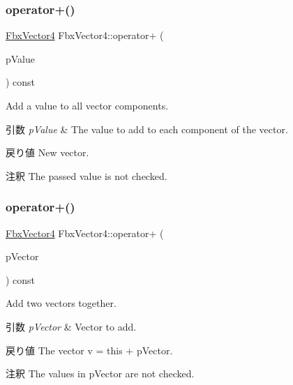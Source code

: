 \subsubsection{\texorpdfstring{operator+()}{operator+()}\hspace{0.1cm}{\footnotesize\ttfamily [1/2]}}
{\footnotesize\ttfamily \hyperlink{class_fbx_vector4}{Fbx\+Vector4} Fbx\+Vector4\+::operator+ (\begin{DoxyParamCaption}\item[{double}]{p\+Value }\end{DoxyParamCaption}) const}

Add a value to all vector components. 
\begin{DoxyParams}{引数}
{\em p\+Value} & The value to add to each component of the vector. \\
\hline
\end{DoxyParams}
\begin{DoxyReturn}{戻り値}
New vector. 
\end{DoxyReturn}
\begin{DoxyRemark}{注釈}
The passed value is not checked. 
\end{DoxyRemark}
\mbox{\label{class_fbx_vector4_aa85736514639224c7e1057facc73a040}} 
\subsubsection{\texorpdfstring{operator+()}{operator+()}\hspace{0.1cm}{\footnotesize\ttfamily [2/2]}}
{\footnotesize\ttfamily \hyperlink{class_fbx_vector4}{Fbx\+Vector4} Fbx\+Vector4\+::operator+ (\begin{DoxyParamCaption}\item[{const \hyperlink{class_fbx_vector4}{Fbx\+Vector4} \&}]{p\+Vector }\end{DoxyParamCaption}) const}

Add two vectors together. 
\begin{DoxyParams}{引数}
{\em p\+Vector} & Vector to add. \\
\hline
\end{DoxyParams}
\begin{DoxyReturn}{戻り値}
The vector v\textquotesingle{} = this + p\+Vector. 
\end{DoxyReturn}
\begin{DoxyRemark}{注釈}
The values in p\+Vector are not checked. 
\end{DoxyRemark}
\mbox{\label{class_fbx_vector4_a7585be2323b66c795e0eab14498ee78b}} 
